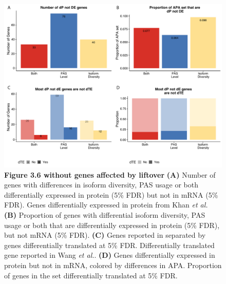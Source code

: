 \begin{figure}[!htb]
\centering
\includegraphics[width=5in]{img/ch03/Fig6-figSup2.pdf}
\caption[Figure 3.6 without genes affected by liftover]{\textbf{Figure 3.6 without genes affected by liftover} {\bf (A)} Number of genes with differences in isoform diversity, PAS usage or both differentially expressed in protein (5\% FDR) but not in mRNA (5\% FDR). Genes differentially expressed in protein from Khan \emph{et al.}\citep{khan_primate_2013} {\bf (B)} Proportion of genes with differential isoform diversity, PAS usage or both that are differentially expressed in protein (5\% FDR), but not mRNA (5\% FDR). {\bf (C)} Genes reported in separated by genes differentially translated at 5\% FDR. Differentially translated gene reported in Wang \emph{et al.}\citep{wang_post-translational_2018}. {\bf (D)} Genes differentially expressed in protein but not in mRNA, colored by differences in APA. Proportion of genes in the set differentially translated at 5\% FDR.}
\label{fig:ch03-unliftfig6}
\end{figure}
\clearpage


